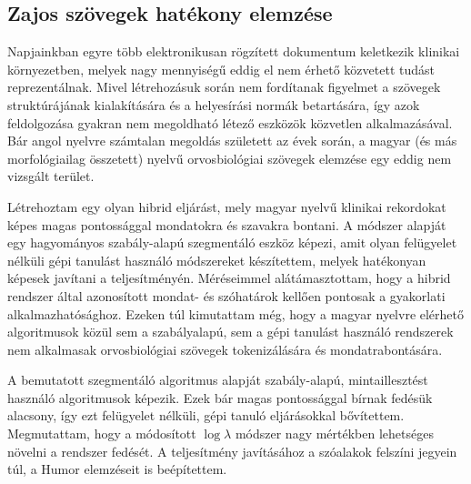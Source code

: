 \subsection{Zajos szövegek hatékony elemzése}
\label{thes:clin}

Napjainkban egyre több elektronikusan rögzített dokumentum keletkezik klinikai környezetben, melyek nagy mennyiségű eddig el nem érhető közvetett tudást reprezentálnak. 
Mivel létrehozásuk során nem fordítanak figyelmet a szövegek struktúrájának kialakítására és a helyesírási normák betartására, így azok feldolgozása gyakran nem megoldható létező eszközök közvetlen alkalmazásával. 
Bár angol nyelvre számtalan megoldás született az évek során, a magyar (és más morfológiailag összetett) nyelvű orvosbiológiai szövegek elemzése egy eddig nem vizsgált terület.

% 
% 



\begin{core}
\begin{thesis}%
\label{thes:clin-segment}
Létrehoztam egy olyan hibrid eljárást, mely magyar nyelvű klinikai rekordokat képes magas pontossággal mondatokra és szavakra bontani. 
A módszer alapját egy hagyományos szabály-alapú szegmentáló eszköz képezi, amit olyan felügyelet nélküli gépi tanulást használó módszereket készítettem, melyek hatékonyan képesek javítani a teljesítményén.
Méréseimmel alátámasztottam, hogy a hibrid rendszer által azonosított mondat- és szóhatárok kellően pontosak a gyakorlati alkalmazhatósághoz.
Ezeken túl kimutattam még, hogy a magyar nyelvre elérhető algoritmusok közül sem a szabályalapú, sem a gépi tanulást használó rendszerek nem alkalmasak orvosbiológiai szövegek tokenizálására és mondatrabontására.
\end{thesis}

\begin{pub}
\cite{Orosz2013d, Orosz2014a}
\end{pub}
\end{core}

A bemutatott szegmentáló algoritmus alapját szabály-alapú, mintaillesztést használó algoritmusok képezik. 
Ezek bár magas pontossággal bírnak fedésük alacsony, így ezt felügyelet nélküli, gépi tanuló eljárásokkal bővítettem.
Megmutattam, hogy a módosított $\log \lambda$ módszer nagy mértékben lehetséges növelni a rendszer fedését. 
A teljesítmény javításához a szóalakok felszíni jegyein túl, a Humor elemzéseit is beépítettem.



